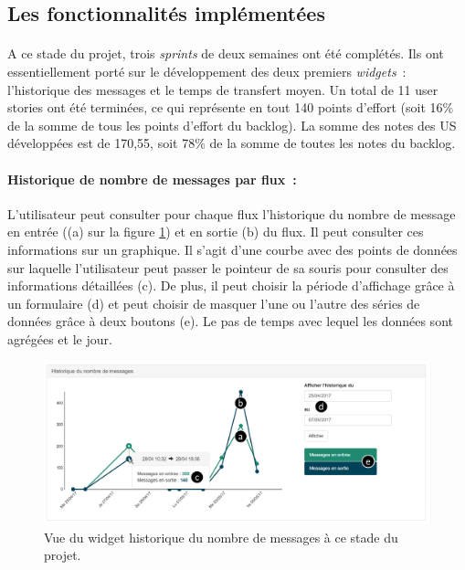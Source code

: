 		\subsection{Les fonctionnalités implémentées}
			\paragraph{}%
			A ce stade du projet, trois \textit{sprints} de deux semaines ont été
			complétés.
			Ils ont essentiellement porté sur le développement des deux premiers
			\textit{widgets}~:
			l'historique des messages et le temps de transfert moyen. Un total de 11 user
			stories ont été terminées, ce qui représente en tout 140 points d'effort
			(soit 16\% de la somme de tous les points d'effort du backlog). La somme des
			notes des US développées est de 170,55, soit 78\% de la somme de toutes
			les notes du backlog.
		
			\paragraph{Historique de nombre de messages par flux~: }
			L'utilisateur peut consulter pour chaque flux l'historique du nombre de
			message en entrée ((a) sur la figure \ref{vue_history}) et en sortie (b) du
			flux. Il peut consulter ces informations sur un graphique. Il s'agit d'une
			courbe avec des points de données sur laquelle l'utilisateur peut passer le
			pointeur de sa souris pour consulter des informations détaillées (c). De
			plus, il peut choisir la période d'affichage grâce à un formulaire (d) et
			peut choisir de masquer l'une ou l'autre des séries de données grâce à deux
			boutons (e). Le pas de temps avec lequel les données sont agrégées et le jour.
			\begin{figure}[H]
				\centering
				\includegraphics[width=16cm]{../img/part3/vue_history.png}
				\caption{\label{vue_history} Vue du widget historique du nombre de messages
				à ce stade du projet.}
			\end{figure}
			

